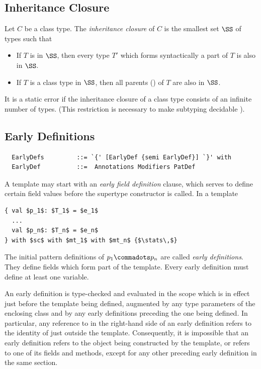 \subsection{Inheritance Closure}\label{sec:inheritance-closure}

Let $C$ be a class type. The {\em inheritance closure} of $C$ is the
smallest set $\SS$ of types such that
\begin{itemize}
\item
If $T$ is in $\SS$, then every type $T'$ which forms syntactically
a part of $T$ is also in $\SS$.
\item
If $T$ is a class type in $\SS$, then all parents ()
of $T$ are also in $\SS$.
\end{itemize}
It is a static error if the inheritance closure of a class type
consists of an infinite number of types. (This restriction is
necessary to make subtyping decidable
\cite{kennedy-pierce:decidable}).

\subsection{Early Definitions}\label{sec:early-defs}

\syntax\begin{lstlisting}
  EarlyDefs         ::= `{' [EarlyDef {semi EarlyDef}] `}' with
  EarlyDef          ::=  Annotations Modifiers PatDef  
\end{lstlisting}

A template may start with an {\em early field definition} clause,
which serves to define certain field values before the supertype
constructor is called. In a template
\begin{lstlisting}
{ val $p_1$: $T_1$ = $e_1$
  ...
  val $p_n$: $T_n$ = $e_n$
} with $sc$ with $mt_1$ with $mt_n$ {$\stats\,$}
\end{lstlisting}
The initial pattern definitions of $p_1 \commadots p_n$ are called
{\em early definitions}. They define fields 
which form part of the template. Every early definition must define
at least one variable. 

An early definition is type-checked and evaluated in the scope which
is in effect just before the template being defined, augmented by any
type parameters of the enclosing class and by any early definitions
preceding the one being defined. In particular, any reference to
\lstinline@this@ in the right-hand side of an early definition refers
to the identity of \lstinline@this@ just outside the template. Consequently, it
is impossible that an early definition refers to the object being
constructed by the template, or refers to one of its fields and
methods, except for any other preceding early definition in the same
section.

